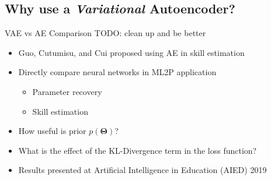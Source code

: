 \documentclass{beamer}
\newcommand{\vect}[1]{\boldsymbol{#1}}
\theoremstyle{definition}
\begin{document}
\subsection{Why use a \textit{Variational} Autoencoder?}

\begin{frame}{VAE vs AE Comparison}
  TODO: clean up and be better %
\begin{itemize}
  \item Guo, Cutumisu, and Cui proposed using AE in skill estimation
  \item Directly compare neural networks in ML2P application
  \begin{itemize}
    \item Parameter recovery
    \item Skill estimation
  \end{itemize}
\item How useful is prior $p(\vect \Theta)$?
\item What is the effect of the KL-Divergence term in the loss function?
  \item<2-> Results presented at Artificial Intelligence in Education (AIED) 2019
\end{itemize}
\end{frame}

\end{document}
